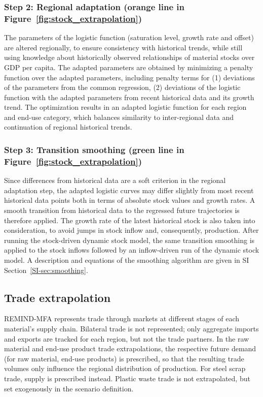 \documentclass[pdflatex]{sn-jnl}
\begin{document}
\subsubsection*{Step 2: Regional adaptation (orange line in Figure~\ref{fig:stock_extrapolation})}
The parameters of the logistic function (saturation level, growth rate and offset) are altered regionally, to ensure consistency with historical trends, while still using knowledge about historically observed relationships of material stocks over GDP per capita. The adapted parameters are obtained by minimizing a penalty function over the adapted parameters, including penalty terms for (1) deviations of the parameters from the common regression, (2) deviations of the logistic function with the adapted parameters from recent historical data and its growth trend. The optimization results in an adapted logistic function for each region and end-use category, which balances similarity to inter-regional data and continuation of regional historical trends.

\subsubsection*{Step 3: Transition smoothing (green line in Figure~\ref{fig:stock_extrapolation})}
Since differences from historical data are a soft criterion in the regional adaptation step, the adapted logistic curves may differ slightly from most recent historical data points both in terms of absolute stock values and growth rates. A smooth transition from historical data to the regressed future trajectories is therefore applied. The growth rate of the latest historical stock is also taken into consideration, to avoid jumps in stock inflow and, consequently, production. After running the stock-driven dynamic stock model, the same transition smoothing is applied to the stock inflows followed by an inflow-driven run of the dynamic stock model. A description and equations of the smoothing algorithm are given in SI Section~\ref{SI-sec:smoothing}.

\subsection{Trade extrapolation}\label{sec:trade_extrapolation}
REMIND-MFA represents trade through markets at different stages of each material's supply chain. Bilateral trade is not represented; only aggregate imports and exports are tracked for each region, but not the trade partners. In the raw material and end-use product trade extrapolations, the respective future demand (for raw material, end-use products) is prescribed, so that the resulting trade volumes only influence the regional distribution of production. For steel scrap trade, supply is prescribed instead. Plastic waste trade is not extrapolated, but set exogenously in the scenario definition.
\end{document}
